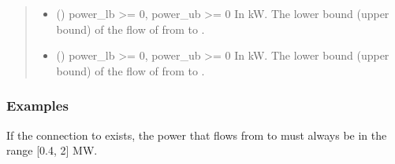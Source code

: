 \documentclass[letterpaper,10pt,english]{sphinxmanual}
\begin{document}
\begin{fulllineitems}
\begin{fulllineitems}
\begin{quote}
\begin{description}
\begin{itemize}
\item {} 
\sphinxAtStartPar
{} (\sphinxstyleliteralemphasis{\sphinxupquote{, }}) \textendash{} power\_lb \textgreater{}= 0, power\_ub \textgreater{}= 0
In kW.
The lower bound (upper bound) of the flow of  from  to .

\item {} 
\sphinxAtStartPar
{} (\sphinxstyleliteralemphasis{\sphinxupquote{, }}) \textendash{} power\_lb \textgreater{}= 0, power\_ub \textgreater{}= 0
In kW.
The lower bound (upper bound) of the flow of  from  to .

\end{itemize}

\end{description}\end{quote}
\subsubsection*{Examples}

\begin{sphinxVerbatim}[commandchars=\\\{\}]
   
\end{sphinxVerbatim}

\sphinxAtStartPar
If the connection  to  exists, the power that flows from  to  must always be in the range
{[}0.4, 2{]} MW.

\begin{sphinxVerbatim}[commandchars=\\\{\}]
  
  
\end{sphinxVerbatim}


\end{fulllineitems}
\end{fulllineitems}
\end{document}
